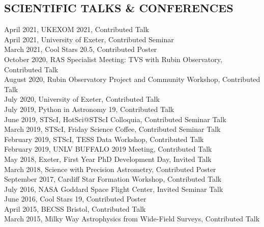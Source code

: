\documentclass[letter, margin, 10pt]{res} %
\begin{document}
\begin{resume}

\parskip \baselineskip
\vspace{-6pt}
\section{SCIENTIFIC TALKS \& CONFERENCES}

April 2021, UKEXOM 2021, Contributed Talk\\
April 2021, University of Exeter, Contributed Seminar\\
March 2021, Cool Stars 20.5, Contributed Poster\\
October 2020, RAS Specialist Meeting: TVS with Rubin Observatory, Contributed Talk\\
August 2020, Rubin Observatory Project and Community Workshop, Contributed Talk\\
July 2020, University of Exeter, Contributed Talk\\
July 2019, Python in Astronomy 19, Contributed Talk\\
June 2019, STScI, HotSci@STScI Colloquia, Contributed Seminar Talk\\
March 2019, STScI, Friday Science Coffee, Contributed Seminar Talk\\
February 2019, STScI, TESS Data Workshop, Contributed Talk\\
February 2019, UNLV BUFFALO 2019 Meeting, Contributed Talk\\
May 2018, Exeter, First Year PhD Development Day, Invited Talk\\
March 2018, Science with Precision Astrometry, Contributed Poster\\
September 2017, Cardiff Star Formation Workshop, Contributed Talk\\
July 2016, NASA Goddard Space Flight Center, Invited Seminar Talk\\
June 2016, Cool Stars 19, Contributed Poster\\
April 2015, BECSS Bristol, Contributed Talk\\
March 2015, Milky Way Astrophysics from Wide-Field Surveys, Contributed Talk

 \vspace{-6pt}

\end{resume}
\end{document}
